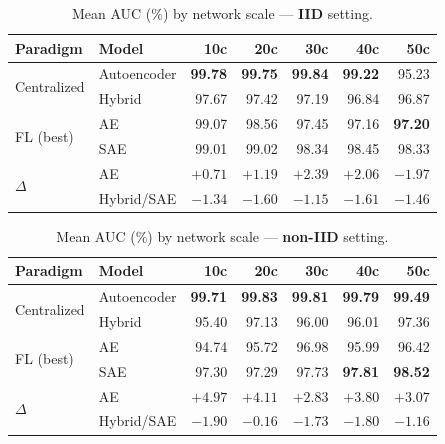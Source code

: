 \documentclass[11pt,a4paper]{article}
\begin{document}
\begin{table}[ht]
\centering
\caption{Mean AUC (\%) by network scale — \textbf{IID} setting.}
\label{tab:scale-iid}
\small
\begin{tabular}{llrrrrr}
\toprule
\textbf{Paradigm} & \textbf{Model}
  & \textbf{10c} & \textbf{20c} & \textbf{30c} & \textbf{40c} & \textbf{50c} \\
\midrule
\multirow{2}{*}{Centralized}
  & Autoencoder  & \textbf{99.78} & \textbf{99.75} & \textbf{99.84} & \textbf{99.22} & 95.23 \\
  & Hybrid       & 97.67          & 97.42          & 97.19          & 96.84          & 96.87 \\
\midrule
\multirow{2}{*}{FL (best)}
  & AE           & 99.07          & 98.56          & 97.45          & 97.16          & \textbf{97.20} \\
  & SAE          & 99.01          & 99.02          & 98.34          & 98.45          & 98.33 \\
\midrule
\multirow{2}{*}{$\Delta$}
  & AE           & $+0.71$ & $+1.19$ & $+2.39$ & $+2.06$ & $-1.97$ \\
  & Hybrid/SAE   & $-1.34$ & $-1.60$ & $-1.15$ & $-1.61$ & $-1.46$ \\
\bottomrule
\end{tabular}
\end{table}

\begin{table}[ht]
\centering
\caption{Mean AUC (\%) by network scale — \textbf{non-IID} setting.}
\label{tab:scale-noniid}
\small
\begin{tabular}{llrrrrr}
\toprule
\textbf{Paradigm} & \textbf{Model}
  & \textbf{10c} & \textbf{20c} & \textbf{30c} & \textbf{40c} & \textbf{50c} \\
\midrule
\multirow{2}{*}{Centralized}
  & Autoencoder  & \textbf{99.71} & \textbf{99.83} & \textbf{99.81} & \textbf{99.79} & \textbf{99.49} \\
  & Hybrid       & 95.40          & 97.13          & 96.00          & 96.01          & 97.36 \\
\midrule
\multirow{2}{*}{FL (best)}
  & AE           & 94.74          & 95.72          & 96.98          & 95.99          & 96.42 \\
  & SAE          & 97.30          & 97.29          & 97.73          & \textbf{97.81} & \textbf{98.52} \\
\midrule
\multirow{2}{*}{$\Delta$}
  & AE           & $+4.97$ & $+4.11$ & $+2.83$ & $+3.80$ & $+3.07$ \\
  & Hybrid/SAE   & $-1.90$ & $-0.16$ & $-1.73$ & $-1.80$ & $-1.16$ \\
\bottomrule
\end{tabular}
\end{table}
\end{document}
